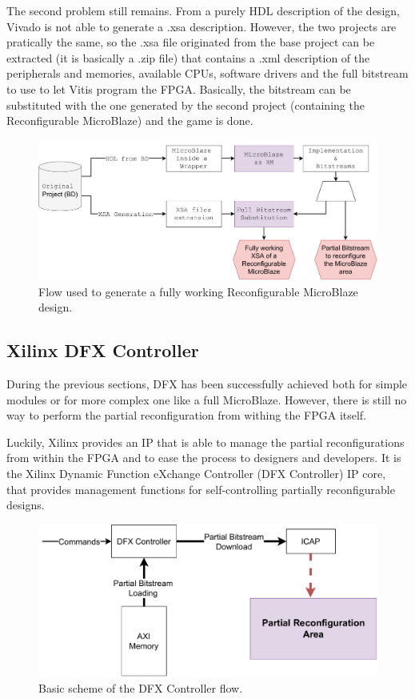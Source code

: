 The second problem still remains. From a purely HDL description of the design, Vivado is not able to generate a .xsa description. However, the two projects are pratically the same, so the .xsa file originated from the base project can be extracted (it is basically a .zip file) that contains a .xml description of the peripherals and memories, available CPUs, software drivers and the full bitstream to use to let Vitis program the FPGA. Basically, the bitstream can be substituted with the one generated by the second project (containing the Reconfigurable MicroBlaze) and the game is done.

\begin{figure}[H]
\centering
\includegraphics[width=1.0\linewidth]{images/chapter4/mystic_flow.pdf}
\caption{Flow used to generate a fully working Reconfigurable MicroBlaze design.}
\label{fig:mystic_flow}
\end{figure}

\subsection{Xilinx DFX Controller}
During the previous sections, DFX has been successfully achieved both for simple modules or for more complex one like a full MicroBlaze. However, there is still no way to perform the partial reconfiguration from withing the FPGA itself. \bigskip

Luckily, Xilinx provides an IP that is able to manage the partial reconfigurations from within the FPGA and to ease the process to designers and developers. It is the Xilinx Dynamic Function eXchange Controller (DFX Controller) IP core, that provides management functions for self-controlling partially reconfigurable designs. \bigskip

\begin{figure}[H]
\centering
\includegraphics[width=0.9\linewidth]{images/chapter4/dfxc.pdf}
\caption{Basic scheme of the DFX Controller flow.}
\end{figure}

